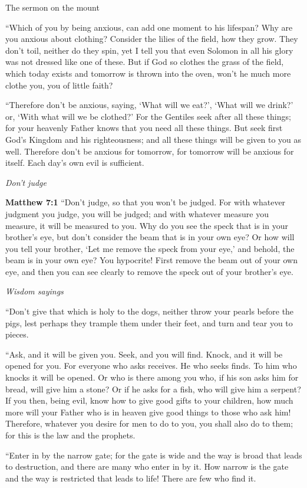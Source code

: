 \documentclass[10pt,twoside]{book}
\newcommand{\quotesize}{\normalsize{}}
\newenvironment{quotetext}{\begingroup\quotesize}{\endgroup}
\newcommand{\bible}[2]{\begin{quotetext}\textbf{#1} #2\end{quotetext}}
\newcommand{\matthew}[2]{\bible{Matthew #1}{#2}}
\newcommand{\subhead}[1]{\emph{#1}\par}
\begin{document}
\begin{section}{The sermon on the mount}
{   ``Which of you by being anxious, can add one moment to his lifespan?    Why are you anxious about clothing? Consider the lilies of the field, how they grow. They don't toil, neither do they spin,    yet I tell you that even Solomon in all his glory was not dressed like one of these.    But if God so clothes the grass of the field, which today exists and tomorrow is thrown into the oven, won't he much more clothe you, you of little faith?

   ``Therefore don't be anxious, saying, `What will we eat?', `What will we drink?' or, `With what will we be clothed?'    For the Gentiles seek after all these things; for your heavenly Father knows that you need all these things.    But seek first God's Kingdom and his righteousness; and all these things will be given to you as well.    Therefore don't be anxious for tomorrow, for tomorrow will be anxious for itself. Each day's own evil is sufficient. 
}

\subhead{Don't judge}

\matthew{7:1}{
    ``Don't judge, so that you won't be judged.    For with whatever judgment you judge, you will be judged; and with whatever measure you measure, it will be measured to you.    Why do you see the speck that is in your brother's eye, but don't consider the beam that is in your own eye?    Or how will you tell your brother, `Let me remove the speck from your eye,' and behold, the beam is in your own eye?    You hypocrite! First remove the beam out of your own eye, and then you can see clearly to remove the speck out of your brother's eye.

\subhead{Wisdom sayings}

   ``Don't give that which is holy to the dogs, neither throw your pearls before the pigs, lest perhaps they trample them under their feet, and turn and tear you to pieces.

   ``Ask, and it will be given you. Seek, and you will find. Knock, and it will be opened for you.    For everyone who asks receives. He who seeks finds. To him who knocks it will be opened.    Or who is there among you who, if his son asks him for bread, will give him a stone?    Or if he asks for a fish, who will give him a serpent?    If you then, being evil, know how to give good gifts to your children, how much more will your Father who is in heaven give good things to those who ask him!    Therefore, whatever you desire for men to do to you, you shall also do to them; for this is the law and the prophets.

   ``Enter in by the narrow gate; for the gate is wide and the way is broad that leads to destruction, and there are many who enter in by it.    How narrow is the gate and the way is restricted that leads to life! There are few who find it.

}
\end{section}
\end{document}
